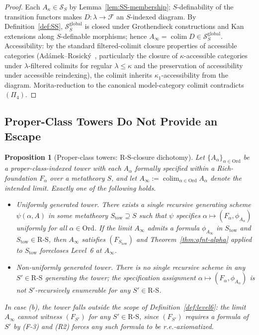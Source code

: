 \documentclass[11pt]{article}
\theoremstyle{plain}
\newtheorem{proposition}[theorem]{Proposition}
\theoremstyle{definition}
\newcommand{\RS}{\mathrm{R\text{-}S}}
\newcommand{\cS}{\mathcal{S}}
\newcommand{\cF}{\mathcal{F}}
\DeclareMathOperator{\colim}{colim}
\begin{document}
\begin{proof}
Each $A_\kappa \in \cS_S$ by Lemma~\ref{lem:SS-membership}; $S$-definability of the transition functors makes $D : \lambda \to \cF$ an $S$-indexed diagram. By Definition~\ref{def:SS}, $\cS_S^{\mathrm{global}}$ is closed under Grothendieck constructions and Kan extensions along $S$-definable morphisms; hence $A_\infty = \colim D \in \cS_S^{\mathrm{global}}$. Accessibility: by the standard filtered-colimit closure properties of accessible categories (Ad\'amek--Rosick\'y~\cite{AdamekRosicky1994}, particularly the closure of $\kappa$-accessible categories under $\lambda$-filtered colimits for regular $\lambda \leq \kappa$ and the preservation of accessibility under accessible reindexing), the colimit inherits $\kappa_1$-accessibility from the diagram. Morita-reduction to the canonical model-category colimit contradicts $(\Pi_4)$.
\end{proof}

\subsection{Proper-Class Towers Do Not Provide an Escape}

\begin{proposition}[Proper-class towers: $\RS$-closure dichotomy]\label{prop:proper-class}
Let $\{A_\alpha\}_{\alpha \in \mathrm{Ord}}$ be a proper-class-indexed tower with each $A_\alpha$ formally specified within a Rich-foundation $F_\alpha$ over a metatheory $S$, and let $A_\infty := \colim_{\alpha \in \mathrm{Ord}} A_\alpha$ denote the intended limit. Exactly one of the following holds.
\begin{itemize}
\item[\textbf{(a)}] \emph{Uniformly generated tower.} There exists a single recursive generating scheme $\psi(\alpha, A)$ in some metatheory $S_{\mathrm{tow}} \supseteq S$ such that $\psi$ specifies $\alpha \mapsto (F_\alpha, \phi_{A_\alpha})$ uniformly for all $\alpha \in \mathrm{Ord}$. If the limit $A_\infty$ admits a formula $\phi_{A_\infty}$ in $S_{\mathrm{tow}}$ and $S_{\mathrm{tow}} \in \RS$, then $A_\infty$ satisfies $(F_{S_{\mathrm{tow}}})$ and Theorem~\ref{thm:afnt-alpha} applied to $S_{\mathrm{tow}}$ forecloses Level~6 at $A_\infty$.
\item[\textbf{(b)}] \emph{Non-uniformly generated tower.} There is no single recursive scheme in any $S' \in \RS$ generating the tower; the specification assignment $\alpha \mapsto (F_\alpha, \phi_{A_\alpha})$ is not $S'$-recursively enumerable for any $S' \in \RS$.
\end{itemize}
In case (b), the tower falls outside the scope of Definition~\ref{def:level6}: the limit $A_\infty$ cannot witness $(F_{S'})$ for any $S' \in \RS$, since $(F_{S'})$ requires a formula of $S'$ by (F-3) and (R2) forces any such formula to be r.e.-axiomatized.
\end{proposition}
\end{document}
